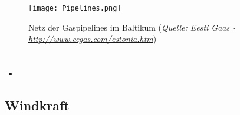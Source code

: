 \documentclass[11pt,a4paper]{article}
\begin{document}
\newpage



\begin{figure}[htb]


  \begin{centering}
   \texttt{[image: Pipelines.png]} %
    \caption{Netz der Gaspipelines im Baltikum (\small{\textsl{Quelle:
	Eesti Gaas -\textcolor{MidnightBlue}{\url{http://www.eegas.com/estonia.htm}}})}}

  \end{centering}

\end{figure}

\newpage





\section*{\color{MidnightBlue}{Eneuerbare Energien im Baltikum}}

\begin{itemize}

\item 


\end{itemize}


\subsection*{Windkraft}
\end{document}

